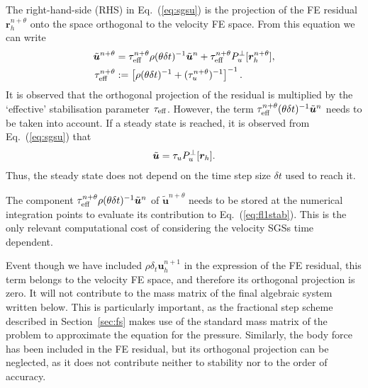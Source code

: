 \documentclass[11pt,a4paper,oneside,reqno]{amsart}
\newcommand{\Eq}[1]{(\ref{eq:#1})}
\def\u{{\bm u}}
\def\el{{\nonumber}}
\begin{document}
The right-hand-side (RHS) in Eq.~\Eq{sgsu} is the projection of the FE residual ${\bm r}_h^{n+\theta}$ onto the space orthogonal to the velocity FE space. From this equation we can write
\begin{align}
 \tilde{\u}^{n+\theta} 
& = \tau_{\rm eff}^{n+\theta} \rho ( {\theta\delta t})^{-1}  \tilde{\u}^n 
+ \tau_{\rm eff}^{n+\theta} P_u^\bot [ {\bm r}_h^{n+\theta} ],\label{eq:11bis}\\
\tau_{\rm eff}^{n+\theta} & := \left[  \rho({\theta\delta t})^{-1} + (\tau_u^{n+\theta})^{-1}\right]^{-1}.\el
\end{align}
It is observed that the orthogonal projection of the residual is multiplied by the `effective' stabilisation parameter  $\tau_{\rm eff}$. However, the term $\tau_{\rm eff}^{n+\theta} ( {\theta\delta t})^{-1}  \tilde{\u}^n$ needs to be taken into account. If a steady state is reached, it is observed from Eq.~\Eq{sgsu} that 
\begin{align}
 \tilde{\u} = \tau_u P_u^\bot [ {\bm r}_h].\el
\end{align}
Thus, the steady state does not depend on the time step size $\delta t$ used to reach it. 

The component $\tau_{\rm eff}^{n+\theta}\rho ( {\theta\delta t})^{-1}  \tilde{\u}^n$ of  $\tilde{\u}^{n+\theta}$ needs to be stored at the numerical integration points to evaluate its contribution to Eq.~\Eq{fl1stab}. This is the only relevant computational cost of considering the velocity SGSs time dependent. 

Event though we have included $\rho\delta_t {\u}_h^{n+1}$ in the expression of the FE residual, this term belongs to the velocity FE space, and therefore its orthogonal projection is zero. It will not contribute to the mass matrix of the final algebraic system written below. This is particularly important, as the fractional step scheme described in Section~\ref{sec:fs} makes use of the standard mass matrix of the problem to approximate the equation for the pressure. Similarly, the body force has been included in the FE residual, but its orthogonal projection can be neglected, as it does not contribute neither to stability nor to the order of accuracy.
\end{document}
